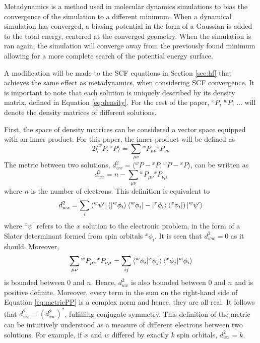 \documentclass[final,3p,times,twocolumn]{elsarticle}
\begin{document}
Metadynamics is a method used in molecular dynamics simulations to bias the convergence of the simulation to a different minimum.\cite{parrinello-2002} When a dynamical simulation has converged, a biasing potential in the form of a Gaussian is added to the total energy, centered at the converged geometry. When the simulation is ran again, the simulation will converge away from the previously found minimum allowing for a more complete search of the potential energy surface.

A modification will be made to the SCF equations in Section \ref{sec:hf} that achieves the same effect as metadynamics, when considering SCF convergence. %
It is important to note that each solution is uniquely described by its density matrix, defined in Equation \eqref{eq:density}. For the rest of the paper, $^xP$, $^wP$, $\ldots$ will denote the density matrices of different solutions. %

First, the space of density matrices can be considered a vector space equipped with an inner product. For this paper, the inner product will be defined as
\begin{equation} \label{eq:innerproduct}
2\langle ^wP,{}^xP \rangle = \sum_{\mu\nu}{}^wP_{\mu\nu}{}^xP_{\nu\mu}
\end{equation}
The metric between two solutions, $d_{wx}^2 = \langle {}^wP - {}^xP, {}^wP - {}^xP \rangle$, can be written as
\begin{equation} \label{eq:metric}
d_{wx}^2 = n - \sum_{\mu\nu}{}^wP_{\mu\nu}{}^xP_{\nu\mu}
\end{equation}
where $n$ is the number of electrons. This definition is equivalent to
\begin{equation}
d_{wx}^2 = \sum_i \bra{{}^w\psi^\prime} (\ket{{}^w\phi_i}\bra{{}^w\phi_i} - \ket{{}^x\phi_i}\bra{{}^x\phi_i}) \ket{{}^w\psi^\prime}
\end{equation}
where ${}^x\psi^\prime$ refers to the $x$ solution to the electronic problem, in the form of a Slater determinant formed from spin orbitals $^x\phi_i$. It is seen that $d_{ww}^2 = 0$ as it should. Moreover, 
\begin{equation} \label{eq:metricPP}
\sum_{\mu\nu}{}^wP_{\mu\nu}{}^xP_{\nu\mu} = \sum_{ij} \bra{^w\phi_i}\ket{^x\phi_j}\bra{^x\phi_j}\ket{^w\phi_i}
\end{equation}
is bounded between 0 and $n$. Hence, $d_{wx}^2$ is also bounded between 0 and $n$ and is positive definite. Moreover, every term in the sum on the right-hand side of Equation \eqref{eq:metricPP} is a complex norm and hence, they are all real. It follows that $d_{wx}^2 = (d_{xw}^2)^*$, fulfilling conjugate symmetry. This definition of the metric can be intuitively understood as a measure of different electrons between two solutions. For example, if $x$ and $w$ differed by exactly $k$ spin orbitals, $d_{wx}^2 = k$. 
\end{document}
